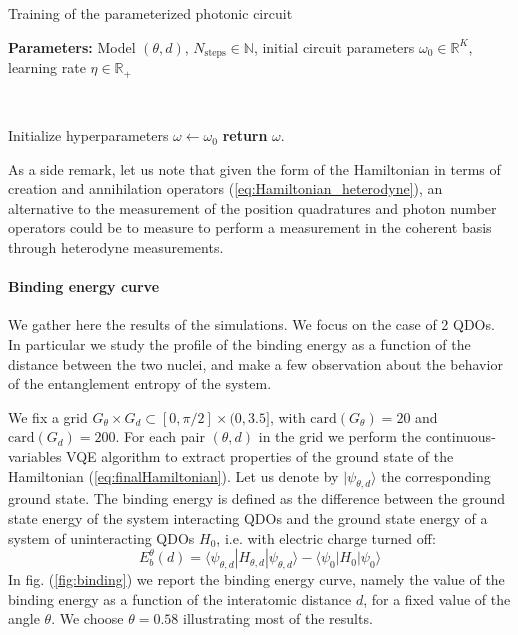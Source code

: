 \documentclass[reprint, amsmath, amssymb, aps, pra]{revtex4-2}
\begin{document}
    \begin{algorithm}
        \caption{Training of the parameterized photonic circuit}\label{alg:training}
        \textbf{Parameters:} Model $(\theta, d)$, $N_\text{steps}\in\mathbb N$, initial circuit parameters $\omega_0\in\mathbb R^K$, learning rate $\eta\in\mathbb R_+$

        \

        Initialize hyperparameters $\omega \gets \omega_0$\;
        \textbf{return} $\omega$.
    \end{algorithm}

    As a side remark, let us note that given the form of the Hamiltonian in terms of creation and annihilation operators (\ref{eq:Hamiltonian_heterodyne}), an alternative to the measurement of the position quadratures and photon number operators could be to measure to perform a measurement in the coherent basis through heterodyne measurements.
    \newline

\paragraph*{Binding energy curve}

    We gather here the results of the simulations. We focus on the case of 2 QDOs. In particular we study the profile of the binding energy as a function of the distance between the two nuclei, and make a few observation about the behavior of the entanglement entropy of the system.

    We fix a grid $G_\theta\times G_d\subset [0, \pi/2]\times (0, 3.5]$, with $\text{card}(G_\theta)=20$ and $\text{card}(G_d)=200$. For each pair $(\theta, d)$ in the grid we perform the continuous-variables VQE algorithm to extract properties of the ground state of the Hamiltonian (\ref{eq:finalHamiltonian}). Let us denote by $|\psi_{\theta, d}\rangle$ the corresponding ground state.
    The binding energy is defined as the difference between the ground state energy of the system interacting QDOs and the ground state energy of a system of uninteracting QDOs $H_0$, i.e. with electric charge turned off:
    \begin{equation}
        E^\theta_b(d) = \langle\psi_{\theta, d}|H_{\theta, d}|\psi_{\theta, d}\rangle - \langle\psi_0|H_0|\psi_0\rangle
    \end{equation}
    In fig. (\ref{fig:binding}) we report the binding energy curve, namely the value of the binding energy as a function of the interatomic distance $d$, for a fixed value of the angle $\theta$. We choose $\theta=0.58$ illustrating most of the results.
\end{document}
